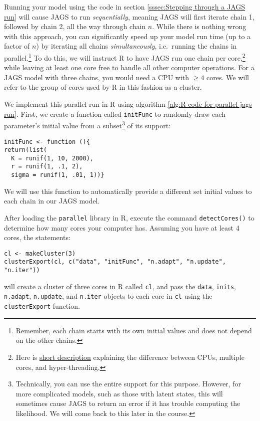 \documentclass[12pt,english]{article}
\begin{document}
Running your model using the code in section \ref{sssec:Stepping through a JAGS run} will cause JAGS to run \emph{sequentially}, meaning JAGS will first iterate chain 1, followed by chain 2, all the way through chain $n$. While there is nothing wrong with this approach, you can significantly speed up your model run time (up to a factor of $n$) by iterating all chains \emph{simultaneously}, i.e.\ running the chains in parallel.\footnote{Remember, each chain starts with its own initial values and does not depend on the other chains.} To do this, we will instruct R to have JAGS run one chain per core,\footnote{Here is \href{http://www.howtogeek.com/194756/cpu-basics-multiple-cpus-cores-and-hyper-threading-explained/}{short description} explaining the difference between CPUs, multiple cores, and hyper-threading.} while leaving at least one core free to handle all other computer operations. For a JAGS model with three chains, you would need a CPU with $\geq 4$ cores. We will refer to the group of cores used by R in this fashion as a cluster.

We implement this parallel run in R using algorithm \ref{alg:R code for parallel jags run}. First, we create a function called \texttt{initFunc} to randomly draw each parameter's initial value from a subset\footnote{Technically, you can use the entire support for this purpose. However, for more complicated models, such as those with latent states, this will sometimes cause JAGS to return an error if it has trouble computing the likelihood. We will come back to this later in the course.} of its support:

\begin{Verbatim}
initFunc <- function (){
return(list(
  K = runif(1, 10, 2000),
  r = runif(1, .1, 2),
  sigma = runif(1, .01, 1))}
\end{Verbatim}

\noindent We will use this function to automatically provide a different set initial values to each chain in our JAGS model.

After loading the \texttt{parallel} library in R, execute the command \texttt{detectCores()} to determine how many cores your computer has. Assuming you have at least 4 cores, the statements:

\begin{Verbatim}
cl <- makeCluster(3)
clusterExport(cl, c("data", "initFunc", "n.adapt", "n.update", "n.iter")) 
\end{Verbatim}

\noindent will create a cluster of three cores in R called \texttt{cl}, and pass the \texttt{data}, \texttt{inits}, \texttt{n.adapt}, \texttt{n.update}, and \texttt{n.iter} objects to each core in \texttt{cl} using the \texttt{clusterExport} function. 
\end{document}
